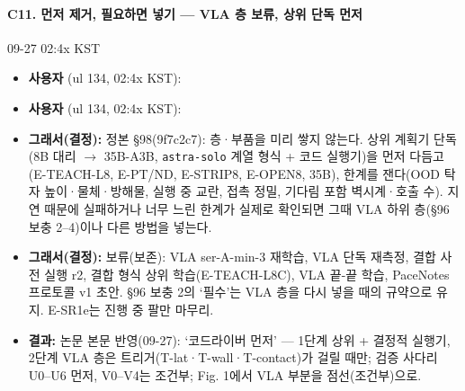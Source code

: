 \paragraph{C11. 먼저 제거, 필요하면 넣기 --- VLA 층 보류, 상위 단독 먼저}
{\small 09-27 02:4x KST}
\begin{itemize}
  \item \textbf{사용자} (ul 134, 02:4x KST): 
  \item \textbf{사용자} (ul 134, 02:4x KST): 
  \item \textbf{그래서(결정):} 정본 §98(9f7c2c7): 층·부품을 미리 쌓지 않는다. 상위 계획기 단독(8B 대리 $\rightarrow$ 35B-A3B, \texttt{astra-\allowbreak{}solo} 계열 형식 + 코드 실행기)을 먼저 다듬고(E-TEACH-L8, E-PT/ND, E-STRIP8, E-OPEN8, 35B), 한계를 잰다(OOD 탁자 높이·물체·방해물, 실행 중 교란, 접촉 정밀, 기다림 포함 벽시계·호출 수). 지연 때문에 실패하거나 너무 느린 한계가 실제로 확인되면 그때 VLA 하위 층(§96 보충 2--4)이나 다른 방법을 넣는다.
  \item \textbf{그래서(결정):} 보류(보존): VLA ser-A-min-3 재학습, VLA 단독 재측정, 결합 사전 실행 r2, 결합 형식 상위 학습(E-TEACH-L8C), VLA 끝-끝 학습, PaceNotes 프로토콜 v1 초안. §96 보충 2의 `필수'는 VLA 층을 다시 넣을 때의 규약으로 유지. E-SR1e는 진행 중 팔만 마무리.
  \item \textbf{결과:} 논문 본문 반영(09-27): `코드라이버 먼저' --- 1단계 상위 + 결정적 실행기, 2단계 VLA 층은 트리거(T-lat·T-wall·T-contact)가 걸릴 때만; 검증 사다리 U0--U6 먼저, V0--V4는 조건부; Fig. 1에서 VLA 부분을 점선(조건부)으로.
\end{itemize}

